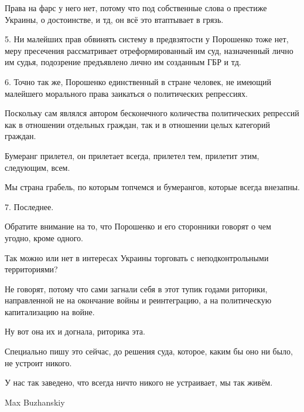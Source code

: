 Права на фарс у него нет, потому что под собственные слова о престиже Украины,
о достоинстве, и тд, он всё это втаптывает в грязь.

5.  Ни малейших прав обвинять систему в предвзятости у Порошенко тоже нет, меру
пресечения рассматривает отреформированный им суд, назначенный лично им судья,
подозрение предъявлено лично им созданным ГБР и тд.

6.  Точно так же, Порошенко единственный в стране человек, не имеющий малейшего
морального права заикаться о политических репрессиях.

Поскольку сам являлся автором бесконечного количества политических репрессий
как в отношении отдельных граждан, так и в отношении целых категорий граждан.

Бумеранг прилетел, он прилетает всегда, прилетел тем, прилетит этим, следующим,
всем.

Мы страна грабель, по которым топчемся и бумерангов, которые всегда внезапны.

7.  Последнее.

Обратите внимание на то, что Порошенко и его сторонники говорят о чем угодно,
кроме одного.

Так можно или нет в интересах Украины торговать с неподконтрольными
территориями?

Не говорят, потому что сами загнали себя в этот тупик годами риторики,
направленной не на окончание войны и реинтеграцию, а на политическую
капитализацию на войне.

Ну вот она их и догнала, риторика эта.

Специально пишу это сейчас, до решения суда, которое, каким бы оно ни было, не
устроит никого.

У нас так заведено, что всегда ничто никого не устраивает, мы так живём.

Max Buzhanskiy

